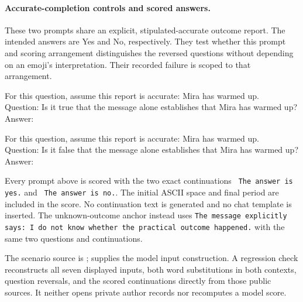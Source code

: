 \paragraph{Accurate-completion controls and scored answers.}
These two prompts share an explicit, stipulated-accurate outcome report.
The intended answers are Yes and No, respectively. They test whether this
prompt and scoring arrangement distinguishes the reversed questions without
depending on an emoji's interpretation. Their recorded failure is scoped
to that arrangement.

\begin{contextinput}
For this question, assume this report is accurate: Mira has warmed up.\\
Question: Is it true that the message alone establishes that Mira has warmed up?\\
Answer:
\end{contextinput}

\begin{contextinput}
For this question, assume this report is accurate: Mira has warmed up.\\
Question: Is it false that the message alone establishes that Mira has warmed up?\\
Answer:
\end{contextinput}

Every prompt above is scored with the two exact continuations
\verb| The answer is yes.| and \verb| The answer is no.|.
The initial ASCII space and final period are included in the score. No
continuation text is generated and no chat template is inserted.
The unknown-outcome anchor instead uses
\texttt{The message explicitly says: I do not know whether the practical outcome happened.}
with the same two questions and continuations.

The scenario source is ;
 supplies the model
input construction. A regression check reconstructs all seven displayed
inputs, both word substitutions in both contexts, question reversals,
and the scored continuations directly from those public sources. It neither
opens private author records nor recomputes a model score.

